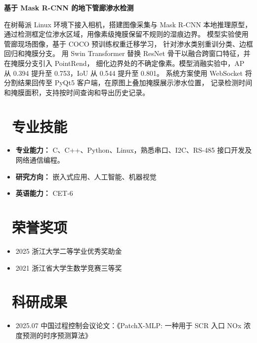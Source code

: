 \documentclass[11pt]{article}
\newlength{\interProjectSpacing}
\newcommand{\projectheading}[3]{%
  \par\addvspace{\interProjectSpacing}%
  \noindent
  \if\relax\detokenize{#1}\relax\else #1\quad\fi
  \textbf{#3}%
  \if\relax\detokenize{#2}\relax\else\quad\textbf{#2}\fi
  \par\nobreak
}
\begin{document}
\projectheading
  {}
  {}
  {基于 Mask R-CNN 的地下管廊渗水检测}
在树莓派 Linux 环境下接入相机，搭建图像采集与 Mask R-CNN 本地推理原型，
通过检测框定位渗水区域，用像素级掩膜保留不规则的湿痕边界。
模型实验使用管廊现场图像，基于 COCO 预训练权重迁移学习，
针对渗水类别重训分类、边框回归和掩膜分支。
用 Swin Transformer 替换 ResNet 骨干以融合跨窗口特征，并在掩膜分支引入 PointRend，
细化边界处的不确定像素。模型消融实验中，AP 从 0.394 提升至 0.753，IoU 从 0.544 提升至 0.801。
系统方案使用 WebSocket 将分割结果回传至 PyQt5 客户端，在原图上叠加掩膜展示渗水位置，
记录检测时间和掩膜面积，支持按时间查询和导出历史记录。

\section{\makebox[\widthof{\faCogs}][c]{\color{CVBlue}\faCogs}\ 专业技能}
\begin{itemize}[nosep]
\item \textbf{专业能力：} C、C++、Python、Linux，熟悉串口、I2C、RS-485 接口开发及网络通信编程。
\item \textbf{研究方向：} 嵌入式应用、人工智能、机器视觉
\item \textbf{英语能力：} CET-6
\end{itemize}
\section{\makebox[\widthof{\faTrophy}][c]{\color{CVBlue}\faTrophy}\ 荣誉奖项}
\begin{itemize}[nosep]
\item 2025 浙江大学二等学业优秀奖助金
\item 2021 浙江省大学生数学竞赛三等奖
\end{itemize}
\section{\makebox[\widthof{\faBook}][c]{\color{CVBlue}\faBook}\ 科研成果}
\begin{itemize}[nosep]
\item 2025.07 中国过程控制会议论文：《PatchX-MLP: 一种用于 SCR 入口 NOx 浓度预测的时序预测算法》
\end{itemize}
\end{document}
